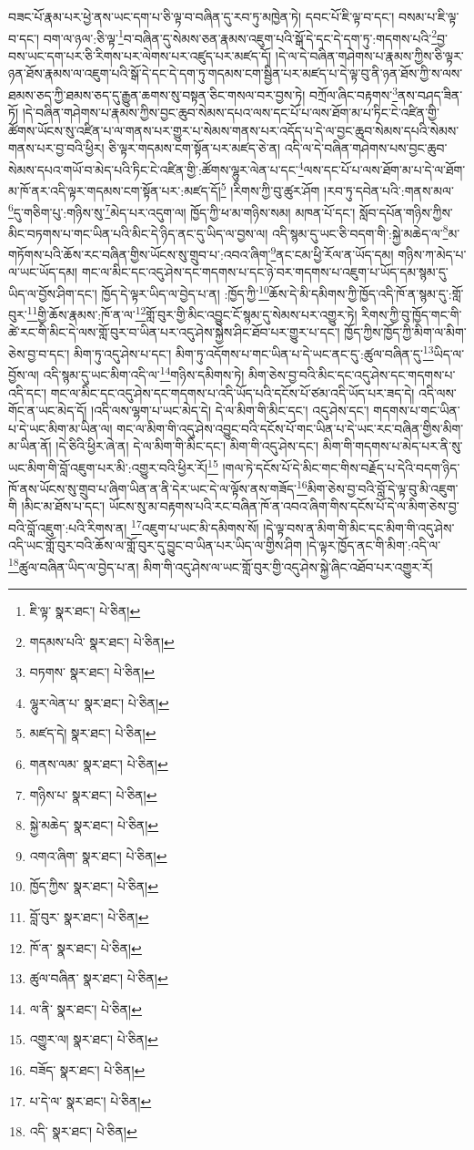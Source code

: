 བཟང་པོ་རྣམ་པར་ཕྱེ་ནས་ཡང་དག་པ་ཅི་ལྟ་བ་བཞིན་དུ་རབ་ཏུ་མཁྱེན་ཏེ། དབང་པོ་ཇི་ལྟ་བ་དང་། བསམ་པ་ཇི་ལྟ་བ་དང་། བག་ལ་ཉལ་:ཅི་ལྟ་\footnote{ཇི་ལྟ་  སྣར་ཐང་།  པེ་ཅིན། }བ་བཞིན་དུ་སེམས་ཅན་རྣམས་འཇུག་པའི་སྒོ་དེ་དང་དེ་དག་ཏུ་:གདགས་པའི་\footnote{གདམས་པའི་  སྣར་ཐང་།  པེ་ཅིན། }བྱ་བས་ཡང་དག་པར་ཅི་རིགས་པར་ལེགས་པར་འཛུད་པར་མཛད་དོ། །དེ་ལ་དེ་བཞིན་གཤེགས་པ་རྣམས་ཀྱིས་ཅི་ལྟར་ཉན་ཐོས་རྣམས་ལ་འཇུག་པའི་སྒོ་དེ་དང་དེ་དག་ཏུ་གདམས་ངག་སྦྱིན་པར་མཛད་པ་དེ་ལྟ་བུ་ནི་ཉན་ཐོས་ཀྱི་ས་ལས་ཐམས་ཅད་ཀྱི་ཐམས་ཅད་དུ་རྒྱུན་ཆགས་སུ་བསྟན་ཅིང་གསལ་བར་བྱས་ཏེ། བཀྲོལ་ཞིང་བརྟགས་\footnote{བཏགས་  སྣར་ཐང་།  པེ་ཅིན། }ནས་བཤད་ཟིན་ཏོ། །དེ་བཞིན་གཤེགས་པ་རྣམས་ཀྱིས་བྱང་ཆུབ་སེམས་དཔའ་ལས་དང་པོ་པ་ལས་ཐོག་མ་པ་ཏིང་ངེ་འཛིན་གྱི་ཚོགས་ཡོངས་སུ་འཛིན་པ་ལ་གནས་པར་གྱུར་པ་སེམས་གནས་པར་འདོད་པ་དེ་ལ་བྱང་ཆུབ་སེམས་དཔའི་སེམས་གནས་པར་བྱ་བའི་ཕྱིར། ཅི་ལྟར་གདམས་ངག་སྟོན་པར་མཛད་ཅེ་ན། འདི་ལ་དེ་བཞིན་གཤེགས་པས་བྱང་ཆུབ་སེམས་དཔའ་གཡོ་བ་མེད་པའི་ཏིང་ངེ་འཛིན་གྱི་:ཚོགས་ལྷུར་ལེན་པ་དང་\footnote{ལྷུར་ལེན་པ་  སྣར་ཐང་།  པེ་ཅིན། }ལས་དང་པོ་པ་ལས་ཐོག་མ་པ་དེ་ལ་ཐོག་མ་ཁོ་ནར་འདི་ལྟར་གདམས་ངག་སྟོན་པར་:མཛད་དོ།\footnote{མཛད་དེ།  སྣར་ཐང་།  པེ་ཅིན། } །རིགས་ཀྱི་བུ་ཚུར་ཤོག །རབ་ཏུ་དབེན་པའི་:གནས་མལ་\footnote{གནས་ལམ་  སྣར་ཐང་།  པེ་ཅིན། }དུ་གཅིག་པུ་:གཉིས་སུ་\footnote{གཉིས་པ་  སྣར་ཐང་།  པེ་ཅིན། }མེད་པར་འདུག་ལ། ཁྱོད་ཀྱི་ཕ་མ་གཉིས་སམ། མཁན་པོ་དང་། སློབ་དཔོན་གཉིས་ཀྱིས་མིང་བཏགས་པ་གང་ཡིན་པའི་མིང་དེ་ཉིད་ནང་དུ་ཡིད་ལ་བྱས་ལ། འདི་སྙམ་དུ་ཡང་ཅི་བདག་གི་:སྐྱེ་མཆེད་ལ་\footnote{སྐྱེ་མཆེད་  སྣར་ཐང་།  པེ་ཅིན། }མ་གཏོགས་པའི་ཆོས་རང་བཞིན་གྱིས་ཡོངས་སུ་གྲུབ་པ་:འབའ་ཞིག་\footnote{འགའ་ཞིག་  སྣར་ཐང་།  པེ་ཅིན། }ནང་ངམ་ཕྱི་རོལ་ན་ཡོད་དམ། གཉིས་ཀ་མེད་པ་ལ་ཡང་ཡོད་དམ། གང་ལ་མིང་དང་འདུ་ཤེས་དང་གདགས་པ་དང་ཉེ་བར་གདགས་པ་འཇུག་པ་ཡོད་དམ་སྙམ་དུ་ཡིད་ལ་བྱོས་ཤིག་དང་། ཁྱོད་དེ་ལྟར་ཡིད་ལ་བྱེད་པ་ན། :ཁྱོད་ཀྱི་\footnote{ཁྱོད་ཀྱིས་  སྣར་ཐང་།  པེ་ཅིན། }ཆོས་དེ་མི་དམིགས་ཀྱི་ཁྱོད་འདི་ཁོ་ན་སྙམ་དུ་:གློ་བུར་\footnote{བློ་བུར་  སྣར་ཐང་།  པེ་ཅིན། }གྱི་ཆོས་རྣམས་:ཁོ་ན་ལ་\footnote{ཁོ་ན་  སྣར་ཐང་།  པེ་ཅིན། }གློ་བུར་གྱི་མིང་འབྱུང་ངོ་སྙམ་དུ་སེམས་པར་འགྱུར་ཏེ། རིགས་ཀྱི་བུ་ཁྱོད་གང་གི་ཚེ་རང་གི་མིང་དེ་ལས་གློ་བུར་བ་ཡིན་པར་འདུ་ཤེས་སྐྱེས་ཤིང་ཐོབ་པར་གྱུར་པ་དང་། ཁྱོད་ཀྱིས་ཁྱོད་ཀྱི་མིག་ལ་མིག་ཅེས་བྱ་བ་དང་། མིག་ཏུ་འདུ་ཤེས་པ་དང་། མིག་ཏུ་འདོགས་པ་གང་ཡིན་པ་དེ་ཡང་ནང་དུ་:ཚུལ་བཞིན་དུ་\footnote{ཚུལ་བཞིན་  སྣར་ཐང་།  པེ་ཅིན། }ཡིད་ལ་བྱོས་ལ། འདི་སྙམ་དུ་ཡང་མིག་འདི་ལ་\footnote{ལ་ནི་  སྣར་ཐང་།  པེ་ཅིན། }གཉིས་དམིགས་ཏེ། མིག་ཅེས་བྱ་བའི་མིང་དང་འདུ་ཤེས་དང་གདགས་པ་འདི་དང་། གང་ལ་མིང་དང་འདུ་ཤེས་དང་གདགས་པ་འདི་ཡོད་པའི་དངོས་པོ་ཙམ་འདི་ཡོད་པར་ཟད་དེ། འདི་ལས་གོང་ན་ཡང་མེད་དོ། །འདི་ལས་ལྷག་པ་ཡང་མེད་དེ། དེ་ལ་མིག་གི་མིང་དང་། འདུ་ཤེས་དང་། གདགས་པ་གང་ཡིན་པ་དེ་ཡང་མིག་མ་ཡིན་ལ། གང་ལ་མིག་གི་འདུ་ཤེས་འབྱུང་བའི་དངོས་པོ་གང་ཡིན་པ་དེ་ཡང་རང་བཞིན་གྱིས་མིག་མ་ཡིན་ནོ། །དེ་ཅིའི་ཕྱིར་ཞེ་ན། དེ་ལ་མིག་གི་མིང་དང་། མིག་གི་འདུ་ཤེས་དང་། མིག་གི་གདགས་པ་མེད་པར་ནི་སུ་ཡང་མིག་གི་བློ་འཇུག་པར་མི་:འགྱུར་བའི་ཕྱིར་རོ།\footnote{འགྱུར་ལ།  སྣར་ཐང་།  པེ་ཅིན། } །གལ་ཏེ་དངོས་པོ་དེ་མིང་གང་གིས་བརྗོད་པ་དེའི་བདག་ཉིད་ཁོ་ནས་ཡོངས་སུ་གྲུབ་པ་ཞིག་ཡིན་ན་ནི་དེར་ཡང་དེ་ལ་ལྟོས་ནས་གཟོད་\footnote{བཟོད་  སྣར་ཐང་།  པེ་ཅིན། }མིག་ཅེས་བྱ་བའི་བློ་དེ་ལྟ་བུ་མི་འཇུག་གི །མིང་མ་ཐོས་པ་དང་། ཡོངས་སུ་མ་བརྟགས་པའི་རང་བཞིན་ཁོ་ན་འབའ་ཞིག་གིས་དངོས་པོ་དེ་ལ་མིག་ཅེས་བྱ་བའི་བློ་འཇུག་:པའི་རིགས་ན། \footnote{པ་དེ་ལ་  སྣར་ཐང་།  པེ་ཅིན། }འཇུག་པ་ཡང་མི་དམིགས་སོ། །དེ་ལྟ་བས་ན་མིག་གི་མིང་དང་མིག་གི་འདུ་ཤེས་འདི་ཡང་གློ་བུར་བའི་ཆོས་ལ་གློ་བུར་དུ་བྱུང་བ་ཡིན་པར་ཡིད་ལ་གྱིས་ཤིག །དེ་ལྟར་ཁྱོད་ནང་གི་མིག་:འདི་ལ་\footnote{འདི་  སྣར་ཐང་།  པེ་ཅིན། }ཚུལ་བཞིན་ཡིད་ལ་བྱེད་པ་ན། མིག་གི་འདུ་ཤེས་ལ་ཡང་གློ་བུར་གྱི་འདུ་ཤེས་སྐྱེ་ཞིང་འཐོབ་པར་འགྱུར་རོ། 